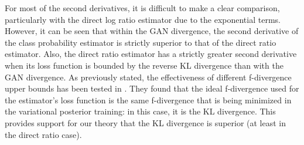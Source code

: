 \documentclass[honours,12pt]{unswthesis}
\numberwithin{equation}{section}
\theoremstyle{definition}
\begin{document}
For most of the second derivatives, it is difficult to make a clear comparison, particularly with the direct log ratio estimator due to the exponential terms. However, it can be seen that within the GAN divergence, the second derivative of the class probability estimator is strictly superior to that of the direct ratio estimator. Also, the direct ratio estimator has a strictly greater second derivative when its loss function is bounded by the reverse KL divergence than with the GAN divergence.
As previously stated, the effectiveness of different f-divergence upper bounds has been tested in \citet{nowozin}. They found that the ideal f-divergence used for the estimator's loss function is the same f-divergence that is being minimized in the variational posterior training: in this case, it is the KL divergence. This provides support for our theory that the KL divergence is superior (at least in the direct ratio case).
\end{document}

